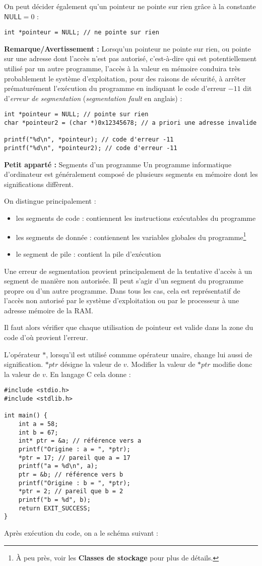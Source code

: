 \documentclass[../../../main.tex]{subfiles}
\begin{document}
On peut décider également qu'un pointeur ne pointe sur rien grâce à la constante $\textsf{NULL} = 0$ :
\begin{verbatim}
int *pointeur = NULL; // ne pointe sur rien
\end{verbatim}
\textbf{Remarque/Avertissement :} Lorsqu'un pointeur ne pointe sur rien, ou pointe sur une adresse dont l'accès n'est pas autorisé, c'est-à-dire qui est potentiellement utilisé par un autre programme, l'accès à la valeur en mémoire conduira très probablement le système d'exploitation, pour des raisons de sécurité, à arrêter prématurément l'exécution du programme en indiquant le code d'erreur $-11$ dit d'\textit{erreur de segmentation} (\textit{segmentation fault} en anglais) :
\begin{verbatim}
int *pointeur = NULL; // pointe sur rien
char *pointeur2 = (char *)0x12345678; // a priori une adresse invalide 

printf("%d\n", *pointeur); // code d'erreur -11
printf("%d\n", *pointeur2); // code d'erreur -11
\end{verbatim}
\begin{minitelbasicbox}{\textbf{Petit apparté :} Segments d'un programme}
Un programme informatique d'ordinateur est généralement composé de plusieurs segments en mémoire dont les significations diffèrent.

On distingue principalement :
\begin{itemize}
	\item les segments de code : contiennent les instructions exécutables du programme
	\item les segments de donnée : contiennent les variables globales du programme\footnote{À peu près, voir les \textbf{Classes de stockage} pour plus de détails.}
	\item le segment de pile : contient la pile d'exécution
\end{itemize}
Une erreur de segmentation provient principalement de la tentative d'accès à un segment de manière non autorisée. Il peut s'agir d'un segment du programme propre ou d'un autre programme. Dans tous les cas, cela est représentatif de l'accès non autorisé par le système d'exploitation ou par le processeur à une adresse mémoire de la RAM.

Il faut alors vérifier que chaque utilisation de pointeur est valide dans la zone du code d'où provient l'erreur.
\end{minitelbasicbox}

L'opérateur $*$, lorsqu'il est utilisé commme opérateur unaire, change lui aussi de signification. $*ptr$ désigne la valeur de $v$. Modifier la valeur de $*ptr$ modifie donc la valeur de $v$. En langage C cela donne :
\begin{verbatim}
#include <stdio.h>
#include <stdlib.h>

int main() {
	int a = 58;
	int b = 67;
	int* ptr = &a; // référence vers a
	printf("Origine : a = ", *ptr);
	*ptr = 17; // pareil que a = 17
	printf("a = %d\n", a);
	ptr = &b; // référence vers b
	printf("Origine : b = ", *ptr);
	*ptr = 2; // pareil que b = 2
	printf("b = %d", b);
	return EXIT_SUCCESS;
}
\end{verbatim}
Après exécution du code, on a le schéma suivant :
\end{document}
